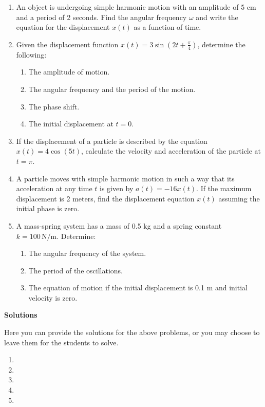 \documentclass[a4paper,12pt]{book}
\newcounter{problem}
\begin{document}
\begin{enumerate}
    \item An object is undergoing simple harmonic motion with an amplitude of 5 cm and a period of 2 seconds. Find the angular frequency \( \omega \) and write the equation for the displacement \( x(t) \) as a function of time.

    \item Given the displacement function \( x(t) = 3 \sin(2t + \frac{\pi}{4}) \), determine the following:
    \begin{enumerate}[label=(\alph*)]
        \item The amplitude of motion.
        \item The angular frequency and the period of the motion.
        \item The phase shift.
        \item The initial displacement at \( t = 0 \).
    \end{enumerate}

    \item If the displacement of a particle is described by the equation \( x(t) = 4 \cos(5t) \), calculate the velocity and acceleration of the particle at \( t = \pi \).

    \item A particle moves with simple harmonic motion in such a way that its acceleration at any time \( t \) is given by \( a(t) = -16x(t) \). If the maximum displacement is 2 meters, find the displacement equation \( x(t) \) assuming the initial phase is zero.

    \item A mass-spring system has a mass of 0.5 kg and a spring constant \( k = 100 \, \text{N/m} \). Determine:
    \begin{enumerate}[label=(\alph*)]
        \item The angular frequency of the system.
        \item The period of the oscillations.
        \item The equation of motion if the initial displacement is 0.1 m and initial velocity is zero.
    \end{enumerate}
\end{enumerate}

\textbf{Solutions}

Here you can provide the solutions for the above problems, or you may choose to leave them for the students to solve.

\begin{enumerate}
    \item %
    \item %
    \item %
    \item %
    \item %
\end{enumerate}
\end{document}
